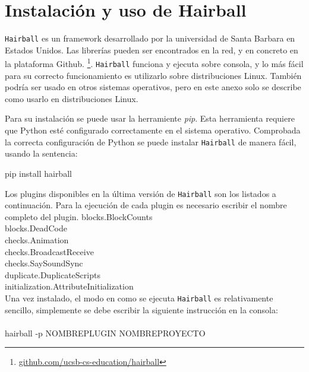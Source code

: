 \documentclass[a4paper, 12pt]{book}
\begin{document}

\cleardoublepage
\appendix

\chapter{Instalación y uso de Hairball}
\texttt{Hairball} es un framework desarrollado por la universidad de Santa
Barbara en Estados Unidos. Las librerías pueden ser encontrados en la red,
y en concreto en la plataforma Github. \footnote{\url{github.com/ucsb-cs-education/hairball}}.
\texttt{Hairball} funciona y ejecuta sobre consola, y lo más fácil para su
correcto funcionamiento es utilizarlo sobre distribuciones Linux. También 
podría ser usado en otros sistemas operativos, pero en este anexo solo se
describe como usarlo en distribuciones Linux. 

Para su instalación se puede usar la herramiente \emph{pip}. Esta herramienta
requiere que Python esté configurado correctamente en el sistema operativo.
Comprobada la correcta configuración de Python se puede instalar \texttt{Hairball}
de manera fácil, usando la sentencia:

\begin{center}
pip install hairball
\end{center}

Los plugins disponibles en la última versión de \texttt{Hairball} son los listados
a continuación. Para la ejecución de cada plugin es necesario escribir el 
nombre completo del plugin.
blocks.BlockCounts \\
blocks.DeadCode \\
checks.Animation \\
checks.BroadcastReceive \\
checks.SaySoundSync \\
duplicate.DuplicateScripts \\
initialization.AttributeInitialization \\

Una vez instalado, el modo en como se ejecuta \texttt{Hairball} es relativamente
sencillo, simplemente se debe escribir la siguiente instrucción en la consola: \\ \\
hairball -p NOMBREPLUGIN NOMBREPROYECTO
\end{document}
